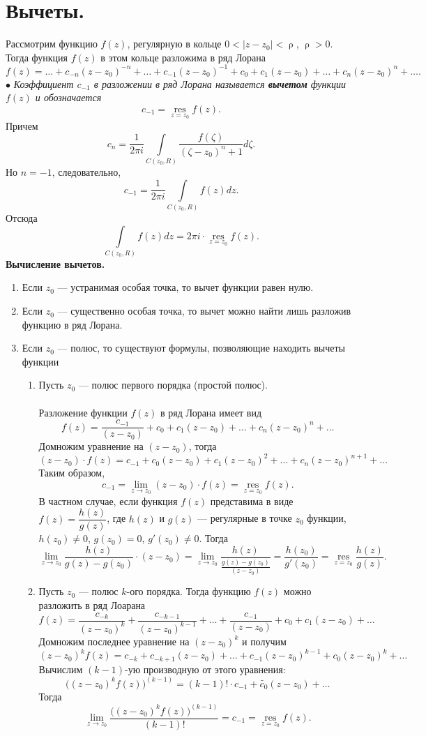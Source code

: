 \documentclass[a4paper, 12pt]{article}
\renewcommand{\rho}{\uprho}
\newcommand{\rl}{f(z) = \ldots + c_{-n}(z-z_0)^{-n} + \ldots + c_{-1}(z-z_0)^{-1} + c_0 + c_1(z-z_0) + \ldots + c_n(z-z_0)^n + \ldots}
\newcommand{\resf}{\underset{z = z_0}{\res}f(z)}
\newcommand{\res}{\operatorname{res}}
\begin{document}
\section{Вычеты.}
Рассмотрим функцию $f(z)$, регулярную в кольце $0 < |z-z_0| < \rho$, $\rho > 0$. Тогда функция $f(z)$ в этом кольце разложима в ряд Лорана
$$\rl.$$
$\bullet$ \textit{Коэффициент $c_{-1}$ в разложении в ряд Лорана называется \textbf{вычетом} функции $f(z)$ и обозначается} $$c_{-1} = \underset{z = z_0}{\res}f(z).$$
Причем $$c_{n} = \dfrac{1}{2\pi i} \int\limits_{C(z_0, R)} \dfrac{f(\zeta)}{(\zeta-z_0)^n+1}d\zeta.$$
Но $n = -1$, следовательно, $$c_{-1} =  \dfrac{1}{2\pi i} \int\limits_{C(z_0, R)} f(z)dz.$$
Отсюда $$\int\limits_{C(z_0, R)} f(z)dz = 2\pi i \cdot \underset{z = z_0}{\res}f(z).$$
\textbf{Вычисление вычетов.}
\begin{enumerate}
	\item Если $z_0$ --- устранимая особая точка, то вычет функции равен нулю.
	\item Если $z_0$ --- существенно особая точка, то вычет можно найти лишь разложив функцию в ряд Лорана.
	\item Если $z_0$ --- полюс, то существуют формулы, позволяющие находить вычеты функции
	\begin{enumerate}
		\item Пусть $z_0$ --- полюс первого порядка (простой полюс).\\\\
		Разложение функции $f(z)$ в ряд Лорана имеет вид 
		$$f(z) =\dfrac{c_{-1}}{(z-z_0)} + c_0 + c_1(z-z_0) + \ldots + c_n(z-z_0)^n + \ldots$$
		Домножим уравнение на $(z-z_0)$, тогда
	$$(z-z_0)\cdot f(z) =c_{-1} + c_0(z-z_0) + c_1(z-z_0)^2 + \ldots + c_n(z-z_0)^{n+1} + \ldots$$
	Таким образом, $$c_{-1} = \lim\limits_{z\to z_0}(z-z_0)\cdot f(z) =\resf.$$
	В частном случае, если функция $f(z)$ представима в виде $f(z) = \dfrac{h(z)}{g(z)}$, где $h(z)$ и $g(z)$ --- регулярные в точке $z_0$ функции, $h(z_0) \ne 0$, $g(z_0) = 0$, $g'(z_0) \ne 0$. Тогда  $$\lim\limits_{z\to z_0} \dfrac{h(z)}{g(z) - g(z_0)}\cdot (z-z_0) = \lim\limits_{z\to z_0} \dfrac{h(z)}{\frac{g(z) - g(z_0)}{(z-z_0)}}= \dfrac{h(z_0)}{g'(z_0)} = \underset{z=z_0}{\res} \dfrac{h(z)}{g(z)}.$$
	\item Пусть $z_0$ --- полюс $k$-ого порядка. Тогда функцию $f(z)$ можно разложить в ряд Лоарана $$f(z) =  \dfrac{c_{-k}}{(z-z_0)^k} + \dfrac{c_{-k-1}}{(z-z_0)^{k-1}} +\ldots + \dfrac{c_{-1}}{(z-z_0)} + c_0 + c_1(z-z_0) + \ldots$$
	Домножим последнее уравнение на $(z-z_0)^k$ и получим $$(z-z_0)^kf(z) = c_{-k} + c_{-k+1}(z-z_0) + \ldots + c_{-1}(z-z_0)^{k-1} + c_0(z-z_0)^k + \ldots$$
	Вычислим $(k-1)$-ую производную от этого уравнения:
	$$\Big((z-z_0)^kf(z)\Big)^{(k-1)} = (k-1)!\cdot c_{-1} + \widetilde{c_0}(z-z_0) + \ldots$$
	Тогда $$\lim\limits_{z\to z_0}\dfrac{\Big((z-z_0)^kf(z)\Big)^{(k-1)} }{(k-1)!} = c_{-1} = \resf.$$
	\end{enumerate}
\end{enumerate}
\end{document}
